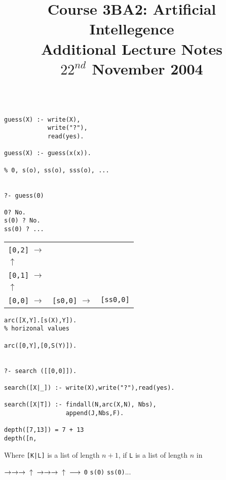 \documentclass[a4paper,12pt]{article}
\begin{document}
\title{Course 3BA2: Artificial Intellegence \\ Additional Lecture Notes \\ $22^{nd}$ November 2004}

\maketitle

\begin{verbatim}

guess(X) :- write(X),
            write("?"),
            read(yes).

guess(X) :- guess(x(x)).

% 0, s(o), ss(o), sss(o), ...


?- guess(0)

0? No.
s(0) ? No.
ss(0) ? ...

\end{verbatim}

\begin{tabular}{lll}
\verb![0,2]! $\to$	&		&		\\
$\uparrow$				&		&		\\
\verb![0,1]! $\to$	&		&		\\
$\uparrow$				&		&		\\
\verb![0,0]! $\to$	& 	\verb![s0,0]!	$\to$ &	\verb![ss0,0]!	\\
\end{tabular}

\begin{verbatim}
arc([X,Y].[s(X),Y]).
% horizonal values

arc([0,Y],[0,S(Y)]).


?- search ([[0,0]]).

search([X|_]) :- write(X),write("?"),read(yes).

search([X|T]) :- findall(N,arc(X,N), Nbs),
                 append(J,Nbs,F).

depth([7,13]) = 7 + 13
depth([n,

\end{verbatim}

Where \verb![K|L]! is a list of length $n + 1$, if \verb!L! is a list of
length $n$ in

$\to \to \to \\
\uparrow \\
\to \to \to \\
\uparrow \\
\longrightarrow$
\verb!0!\hspace{10mm} \verb!s(0)! \hspace{10mm} \verb!ss(0)!...
\end{document}

